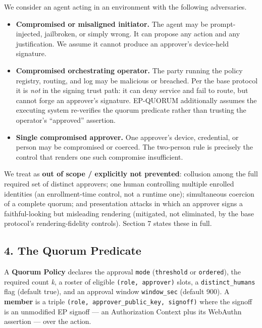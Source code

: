 \documentclass[
  11pt,
]{article}
\providecommand{\tightlist}{%
  \setlength{\itemsep}{0pt}\setlength{\parskip}{0pt}}
\begin{document}
We consider an agent acting in an environment with the following
adversaries.

\begin{itemize}
\tightlist
\item
  \textbf{Compromised or misaligned initiator.} The agent may be
  prompt-injected, jailbroken, or simply wrong. It can propose any
  action and any justification. We assume it cannot produce an
  approver's device-held signature.
\item
  \textbf{Compromised orchestrating operator.} The party running the
  policy registry, routing, and log may be malicious or breached. Per
  the base protocol it is \emph{not} in the signing trust path: it can
  deny service and fail to route, but cannot forge an approver's
  signature. EP-QUORUM additionally assumes the executing system
  re-verifies the quorum predicate rather than trusting the operator's
  ``approved'' assertion.
\item
  \textbf{Single compromised approver.} One approver's device,
  credential, or person may be compromised or coerced. The two-person
  rule is precisely the control that renders one such compromise
  insufficient.
\end{itemize}

We treat as \textbf{out of scope / explicitly not prevented}: collusion
among the full required set of distinct approvers; one human controlling
multiple enrolled identities (an enrollment-time control, not a runtime
one); simultaneous coercion of a complete quorum; and presentation
attacks in which an approver signs a faithful-looking but misleading
rendering (mitigated, not eliminated, by the base protocol's
rendering-fidelity controls). Section 7 states these in full.

\subsection{4. The Quorum Predicate}\label{the-quorum-predicate}

A \textbf{Quorum Policy} declares the approval \texttt{mode}
(\texttt{threshold} or \texttt{ordered}), the required count \emph{k}, a
roster of eligible \texttt{(role,\ approver)} slots, a
\texttt{distinct\_humans} flag (default true), and an approval window
\texttt{window\_sec} (default 900). A \textbf{member} is a triple
\texttt{(role,\ approver\_public\_key,\ signoff)} where the signoff is
an unmodified EP signoff --- an Authorization Context plus its WebAuthn
assertion --- over the action.
\end{document}
